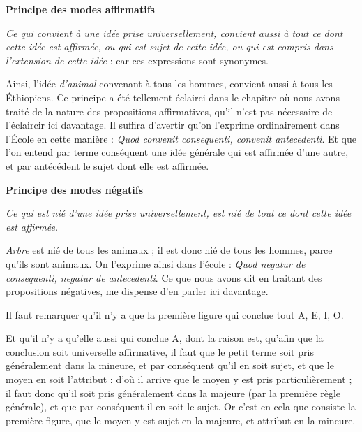 \begin{center}{\bfseries Principe des modes affirmatifs}\end{center}

\emph{Ce qui convient à une idée prise universellement, convient aussi à tout ce dont cette idée est affirmée, ou qui est sujet de cette idée, ou qui est compris dans l'extension de cette idée} : car ces expressions sont synonymes.

Ainsi, l'idée \emph{d'animal} convenant à tous les hommes, convient aussi à tous les Éthiopiens. Ce principe a été tellement éclairci dans le chapitre où nous avons traité de la nature des propositions affirmatives, qu'il n'est pas nécessaire de l'éclaircir ici davantage. Il suffira d'avertir qu'on l'exprime ordinairement dans l'École en cette manière : \emph{Quod convenit consequenti, convenit antecedenti}. Et que l'on entend par terme conséquent une idée générale qui est affirmée d'une autre, et par antécédent le sujet dont elle est affirmée.

\bigbreak
\bigbreak
\begin{center}{\bfseries Principe des modes négatifs}\end{center}

\emph{Ce qui est nié d'une idée prise universellement, est nié de tout ce dont cette idée est affirmée.}

\emph{Arbre} est nié de tous les animaux ; il est donc nié de tous les hommes, parce qu'ils sont animaux. On l'exprime ainsi dans l'école : \emph{Quod negatur de consequenti, negatur de antecedenti}. Ce que nous avons dit en traitant des propositions négatives, me dispense d'en parler ici davantage.

\bigbreak
Il faut remarquer qu'il n'y a que la première figure qui conclue tout A, E, I, O.

Et qu'il n'y a qu'elle aussi qui conclue A, dont la raison est, qu'afin que la conclusion soit universelle affirmative, il faut que le petit terme soit pris généralement dans la mineure, et par conséquent qu'il en soit sujet, et que le moyen en soit l'attribut : d'où il arrive que le moyen y est pris particulièrement ; il faut donc qu'il soit pris généralement dans la majeure (par la première règle générale), et que par conséquent il en soit le sujet. Or c'est en cela que consiste la première figure, que le moyen y est sujet en la majeure, et attribut en la mineure.


